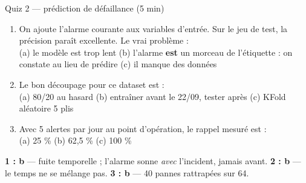 \begin{frame}{Quiz 2 --- prédiction de défaillance (5 min)}
\begin{qbox}[3 questions]
\begin{enumerate}
\item On ajoute l'alarme courante aux variables d'entrée. Sur le jeu de
test, la précision paraît excellente. Le vrai problème :\\
(a) le modèle est trop lent \quad (b) l'alarme \textbf{est} un morceau
de l'étiquette : on constate au lieu de prédire \quad (c) il manque des
données
\item Le bon découpage pour ce dataset est :\\
(a) 80/20 au hasard \quad (b) entraîner avant le 22/09, tester après
\quad (c) KFold aléatoire 5 plis
\item Avec 5 alertes par jour au point d'opération, le rappel mesuré est :\\
(a) 25 \% \quad (b) 62,5 \% \quad (c) 100 \%
\end{enumerate}
\end{qbox}
\vspace{1mm}
\begin{solbox}[Réponses]
\textbf{1 : b} --- fuite temporelle ; l'alarme sonne \emph{avec}
l'incident, jamais avant. \quad \textbf{2 : b} --- le temps ne se
mélange pas. \quad \textbf{3 : b} --- 40 pannes rattrapées sur 64.
\end{solbox}
\end{frame}
